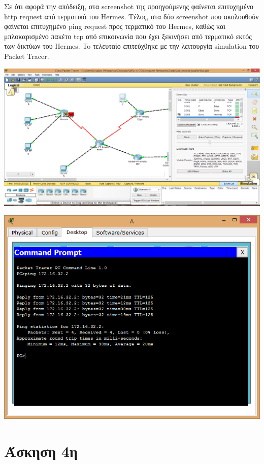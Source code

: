 \documentclass{assignment}
\begin{document}
Σε ότι αφορά την απόδειξη, στα screenshot της προηγούμενης φαίνεται επιτυχημένο
http request από τερματικό του Hermes. Τέλος, στα δύο screenshot που ακολουθούν
φαίνεται επιτυχημένο ping request προς τερματικό του Hermes, καθώς και
μπλοκαρισμένο πακέτο tcp από επικοινωνία που έχει ξεκινήσει από τερματικό
εκτός των δικτύων του Hermes. To τελευταίο επιτεύχθηκε με την λειτουργία simulation
του Packet Tracer.
\begin{center}
\includegraphics[width=\textwidth, height=\textheight, keepaspectratio]{images/third.png}
\end{center}
\begin{center}
\includegraphics[width=\textwidth, height=\textheight, keepaspectratio]{images/third2.png}
\end{center}

\section{Άσκηση 4η}
\end{document}

